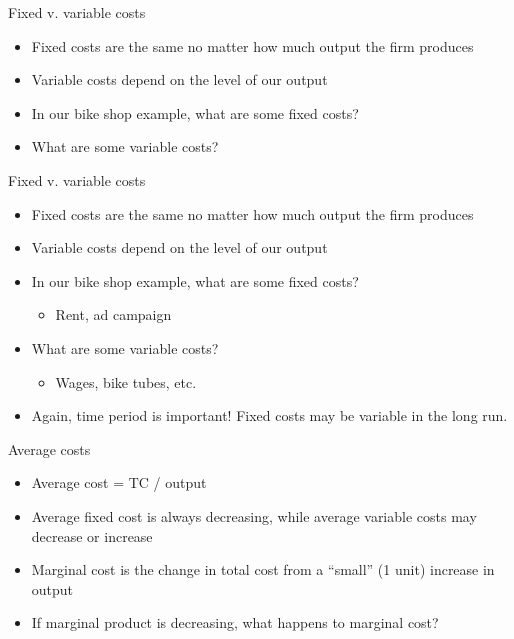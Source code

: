 \documentclass[aspectratio=169]{beamer}
\begin{document}
\begin{frame}{Fixed v. variable costs}
    \begin{itemize}
        \item Fixed costs are the same no matter how much output the firm produces
        \item Variable costs depend on the level of our output
        \item In our bike shop example, what are some fixed costs?
        \item What are some variable costs?
    \end{itemize}
\end{frame}

\begin{frame}{Fixed v. variable costs}
    \begin{itemize}
        \item Fixed costs are the same no matter how much output the firm produces
        \item Variable costs depend on the level of our output
        \item In our bike shop example, what are some fixed costs?
            \begin{itemize}
                \item Rent, ad campaign
            \end{itemize}
        \item What are some variable costs?
            \begin{itemize}
                \item Wages, bike tubes, etc.
            \end{itemize}
        \item Again, time period is important! Fixed costs may be variable in the long run.
    \end{itemize}
\end{frame}

\begin{frame}{Average costs}
    \begin{itemize}
        \item Average cost = TC / output
        \item Average fixed cost is always decreasing, while average variable costs may decrease or increase
        \item Marginal cost is the change in total cost from a ``small'' (1 unit) increase in output
        \item If marginal product is decreasing, what happens to marginal cost?
    \end{itemize}
\end{frame}
\end{document}
